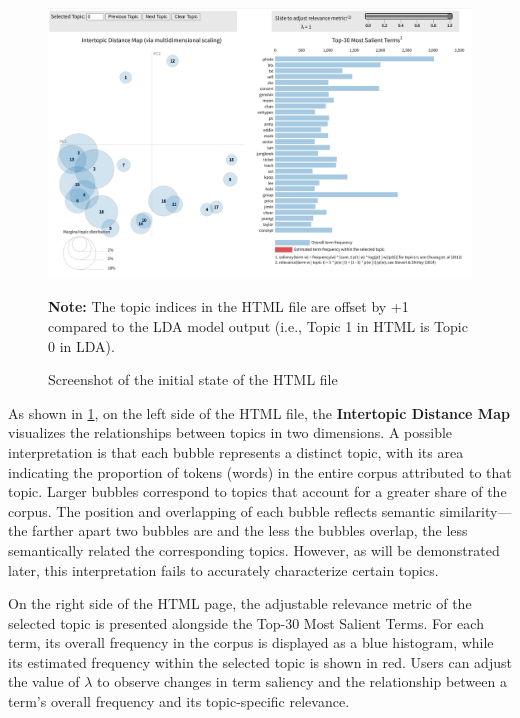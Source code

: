\documentclass[12pt]{article}
\numberwithin{figure}{section}  %
\begin{document}
		\begin{figure}[H]
			\centering
			\includegraphics[width=1\textwidth]{Q2html0} 
			\caption{\centering Screenshot of the initial state of the HTML file}	
			\label{fig:HTML}	
			\vspace{-0.5em} %
    \parbox{\linewidth}{\small \textbf{Note:} The topic indices in the HTML file
	are offset by +1 compared to the LDA model output (i.e., Topic 1 in HTML is
	Topic 0 in LDA).}
		\end{figure}
	
	
	As shown in \cref{fig:HTML}, on the left side of the HTML file, the
	\textbf{Intertopic Distance Map} visualizes the relationships between topics
	in two dimensions. A possible interpretation is that each bubble represents
	a distinct topic, with its area indicating the proportion of tokens (words)
	in the entire corpus attributed to that topic. Larger bubbles correspond to
	topics that account for a greater share of the corpus. The position and
	overlapping of each bubble reflects semantic similarity—the farther apart
	two bubbles are and the less the bubbles overlap, the less semantically %
	related the corresponding topics. However, as will be demonstrated later,
	this interpretation fails to accurately characterize certain topics.
	
	On the right side of the HTML page, the adjustable relevance metric of the
	selected topic is presented alongside the Top-30 Most Salient Terms. For
	each term, its overall frequency in the corpus is displayed as a blue
	histogram, while its estimated frequency within the selected topic is shown
	in red. Users can adjust the value of $\lambda$ to observe changes in term
	saliency and the relationship between a term’s overall frequency and its
	topic-specific relevance. 
	
\end{document}
